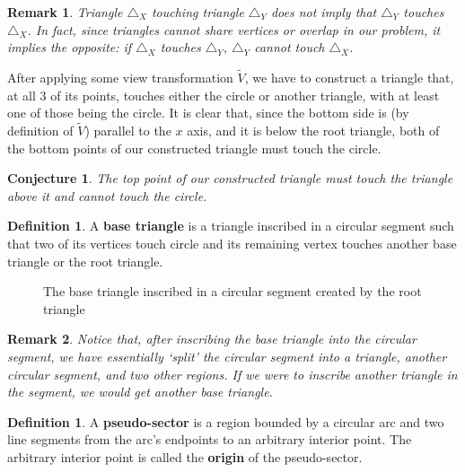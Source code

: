 \documentclass[a4paper,12pt]{article}
\newcommand{\HSview}[1][V]{\widetilde{#1}}
\newtheorem*{remark}{Remark}
\newtheorem{conjecture}[theorem]{Conjecture}
\theoremstyle{definition}
\newtheorem{definition}[theorem]{Definition}
\theoremstyle{plain}
\begin{document}
	\begin{remark}
		Triangle $\triangle_X$ touching triangle $\triangle_Y$ does not imply that $\triangle_Y$ touches $\triangle_X$.
		In fact, since triangles cannot share vertices or overlap in our problem, it implies the opposite:
		if $\triangle_X$ touches $\triangle_Y$, $\triangle_Y$ cannot touch $\triangle_X$.
	\end{remark}
	
	After applying some view transformation $\HSview$, we have to construct a triangle that, at all 3 of its points, touches either the circle or another triangle,
	with at least one of those being the circle. It is clear that, since the bottom side is (by definition of $\HSview$) parallel to the $x$ axis, and it is below the
	root triangle, both of the bottom points of our constructed triangle must touch the circle.
	\begin{conjecture}
		The top point of our constructed triangle must touch the triangle above it and cannot touch the circle.
	\end{conjecture}

	\begin{definition}
		A \textbf{base triangle} is a triangle inscribed in a circular segment such that two of its vertices
		touch circle and its remaining vertex touches another base triangle or the root triangle.
	\end{definition}
	
	\begin{figure}[h]
		\centering
		\def\svgwidth{\columnwidth}
		\scalebox{0.65}{}
		\caption{The base triangle inscribed in a circular segment created by the root triangle}
	\end{figure}

	\begin{remark}
		Notice that, after inscribing the base triangle into the circular segment, we have essentially `split' the circular segment into a triangle, another circular segment, and two other regions.
		If we were to inscribe another triangle in the segment, we would get another base triangle.
	\end{remark}

	\begin{definition}
		A \textbf{pseudo-sector} is a region bounded by a circular arc and two line segments from the arc's endpoints to an arbitrary interior point.
		The arbitrary interior point is called the \textbf{origin} of the pseudo-sector.
	\end{definition}
\end{document}
